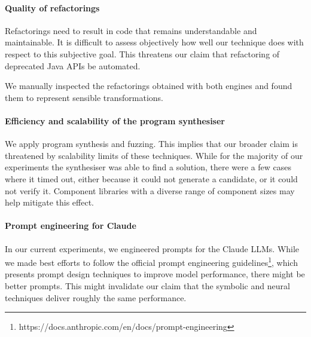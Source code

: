 \documentclass[sigconf]{acmart}
\begin{document}
\paragraph{Quality of refactorings} Refactorings need to result in code that
remains understandable and maintainable.  It is difficult to assess
objectively how well our technique does with respect to this subjective
goal.  This threatens our claim that refactoring of deprecated Java APIs
be automated.

%
We manually inspected the refactorings obtained with
both engines and found them to represent sensible transformations.

\paragraph{Efficiency and scalability of the program synthesiser}
%
We apply program synthesis and fuzzing.  This implies that our broader claim
is threatened by scalability limits of these techniques.  While for the
majority of our experiments the synthesiser was able to find a solution,
there were a few cases where it timed out, either because it could not
generate a candidate, or it could not verify it.  Component libraries with a
diverse range of component sizes may help mitigate this effect.

\paragraph{Prompt engineering for Claude}
%
In our current experiments, we engineered prompts for the Claude LLMs.
While we made best efforts to follow the official prompt engineering
guidelines\footnote{https://docs.anthropic.com/en/docs/prompt-engineering},
which presents prompt design techniques to improve model performance, there
might be better prompts.  This might invalidate our claim that
the symbolic and neural techniques deliver roughly the same performance.

%
\end{document}

